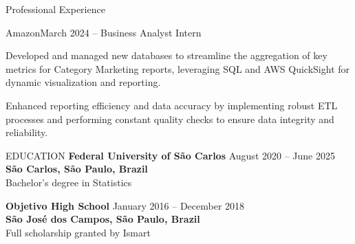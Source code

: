 \documentclass[
	11pt, %
]{cv} %
\begin{document}

\begin{rSection}{Professional Experience}
    \begin{rSubsection}{Amazon}{March 2024 -- }{}{Business Analyst Intern}
    \item Developed and managed new databases to streamline the aggregation of key metrics for Category Marketing reports, leveraging SQL and AWS QuickSight for dynamic visualization and reporting. 
    \item Enhanced reporting efficiency and data accuracy by implementing robust ETL processes and performing constant quality checks to ensure data integrity and reliability.
    \end{rSubsection}
\end{rSection}

\begin{rSection}{EDUCATION}
    \textbf{Federal University of São Carlos} \hfill August 2020 -- June 2025\\ 
    \textbf{São Carlos, São Paulo, Brazil}\\
    Bachelor's degree in Statistics

    \textbf{Objetivo High School} \hfill January 2016 -- December 2018\\ 
    \textbf{São José dos Campos, São Paulo, Brazil}\\
    Full scholarship granted by Ismart
	
\end{rSection}

\end{document}
